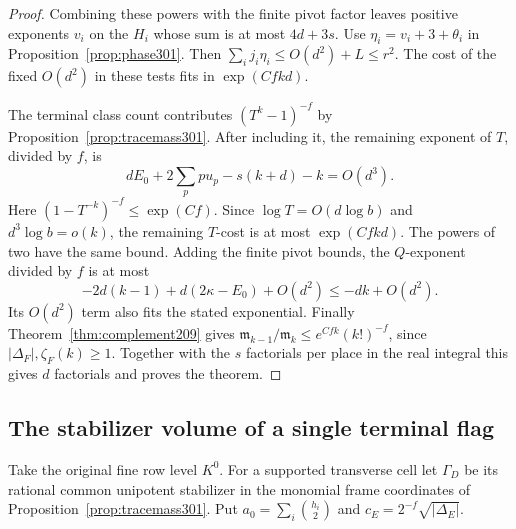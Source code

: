 \documentclass[a4paper,11pt]{article}
\theoremstyle{definition}
\theoremstyle{remark}
\numberwithin{equation}{section}
\begin{document}
\begin{proof}
Combining these powers with the finite pivot factor leaves
positive exponents \(v_i\) on the \(H_i\) whose sum is at
most \(4d+3s\). Use \(\eta_i=v_i+3+\theta_i\) in
Proposition~\ref{prop:phase301}. Then
\(\sum_i j_i\eta_i\le O(d^2)+L\le r^2\). The cost of the
fixed \(O(d^2)\) in these tests fits in \(\exp(Cfkd)\).

The terminal class count contributes \((T^k-1)^{-f}\)
by Proposition~\ref{prop:tracemass301}. After including it,
the remaining exponent of \(T\), divided by \(f\), is
\[
       dE_0+2\sum_p p u_p-s(k+d)-k=O(d^3).
\]
Here \((1-T^{-k})^{-f}\le\exp(Cf)\). Since
\(\log T=O(d\log b)\) and \(d^3\log b=o(k)\),
the remaining \(T\)-cost is at most \(\exp(Cfkd)\).
The powers of two have the same bound. Adding the finite
pivot bounds, the \(Q\)-exponent divided by \(f\) is at most
\[
          -2d(k-1)+d(2\kappa-E_0)+O(d^2)
                     \le -dk+O(d^2).
\]
Its \(O(d^2)\) term also fits the stated exponential.
Finally Theorem~\ref{thm:complement209} gives
\(\mathfrak m_{k-1}/\mathfrak m_k\le e^{Cfk}(k!)^{-f}\),
since \(|\Delta_F|,\zeta_F(k)\ge1\).
Together with the \(s\) factorials per place in the real
integral this gives \(d\) factorials and proves the theorem.
\end{proof}

\subsection{The stabilizer volume of a single terminal flag}\label{nav:II-70}
Take the original fine row level \(K^0\). For a supported
transverse cell let \(\Gamma_D\) be its rational common
unipotent stabilizer in the monomial frame coordinates of
Proposition~\ref{prop:tracemass301}. Put
\(a_0=\sum_i\binom{h_i}{2}\) and
\(c_E=2^{-f}\sqrt{|\Delta_E|}\).
\end{document}
